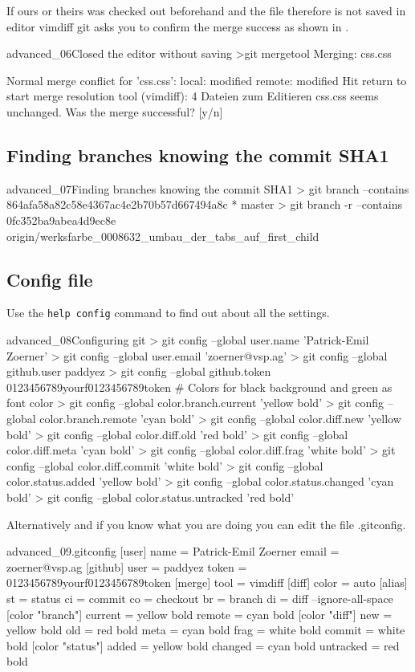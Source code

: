 If ours or theirs was checked out beforehand and the file therefore is not saved in editor vimdiff git asks you to confirm the merge success as shown in .
\begin{codelisting}{advanced_06}{Closed the editor without saving}
>git mergetool
Merging:
css.css

Normal merge conflict for 'css.css':
  {local}: modified
  {remote}: modified
Hit return to start merge resolution tool (vimdiff): 
4 Dateien zum Editieren
css.css seems unchanged.
Was the merge successful? [y/n]
\end{codelisting}
\subsection{Finding branches knowing the commit SHA1}
\begin{codelisting}{advanced_07}{Finding branches knowing the commit SHA1}
> git branch --contains 864afa58a82c58e4367ac4e2b70b57d667494a8c
* master
> git branch -r --contains 0fc352ba9abea4d9ec8e
  origin/werksfarbe_0008632_umbau_der_tabs_auf_first_child
\end{codelisting}
\subsection{Config file}
Use the \texttt{help config} command to find out about all the settings.
\begin{codelisting}{advanced_08}{Configuring git}
> git config --global user.name 'Patrick-Emil Zoerner'
> git config --global user.email 'zoerner@vsp.ag'
> git config --global github.user paddyez
> git config --global github.token 0123456789yourf0123456789token
# Colors for black background and green as font color
> git config --global color.branch.current 'yellow bold'
> git config --global color.branch.remote 'cyan bold'
> git config --global color.diff.new 'yellow bold'
> git config --global color.diff.old 'red bold'
> git config --global color.diff.meta 'cyan bold'
> git config --global color.diff.frag 'white bold'
> git config --global color.diff.commit 'white bold'
> git config --global color.status.added 'yellow bold'
> git config --global color.status.changed 'cyan bold'
> git config --global color.status.untracked 'red bold'
\end{codelisting}
Alternatively and if you know what you are doing you can edit the file .gitconfig.
\begin{codelisting}{advanced_09}{.gitconfig}
[user]
        name = Patrick-Emil Zoerner
        email = zoerner@vsp.ag
[github]
        user = paddyez
        token = 0123456789yourf0123456789token
[merge]
        tool = vimdiff
[diff]
        color = auto
[alias]
        st = status
        ci = commit
        co = checkout
        br = branch
        di = diff --ignore-all-space
[color "branch"]
        current = yellow bold
        remote = cyan bold
[color "diff"]
        new = yellow bold
        old = red bold
        meta = cyan bold
        frag = white bold
        commit = white bold
[color "status"]
        added = yellow bold
        changed = cyan bold
        untracked = red bold
\end{codelisting}
